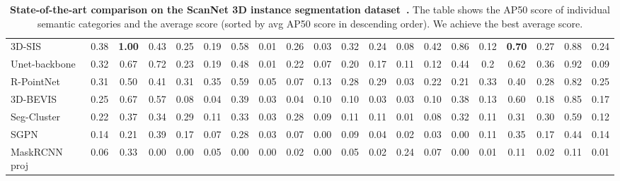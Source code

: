 \documentclass[10pt,twocolumn,letterpaper]{article}
\begin{document}
\begin{table*}[ht!]
{\begin{tabular}{l|c|cccccccccccccccccc}
3D-SIS\cite{hou20183d}         &         0.38  & \textbf{1.00} &         0.43  &         0.25  &         0.19  &         0.58  &         0.01  &         0.26  &         0.03  &         0.32  &         0.24  &         0.08  &         0.42  &         0.86  &         0.12  & \textbf{0.70} &         0.27  &         0.88  &         0.24  \\
Unet-backbone\cite{liang20193d}  &         0.32  &         0.67  &         0.72  &         0.23  &         0.19  &         0.48  &         0.01  &         0.22  &         0.07  &         0.20  &         0.17  &         0.11  &         0.12  &         0.44  &         0.2  &         0.62  &         0.36  &         0.92  &         0.09  \\
R-PointNet\cite{yi2018gspn}     &         0.31  &         0.50  &         0.41  &         0.31  &         0.35  &         0.59  &         0.05  &         0.07  &         0.13  &         0.28  &         0.29  &         0.03  &         0.22  &         0.21  &         0.33  &         0.40  &         0.28  &         0.82  &         0.25  \\
3D-BEVIS       &         0.25 &         0.67  &         0.57  &         0.08  &         0.04  &         0.39  &         0.03  &         0.04  &         0.10  &         0.10  &         0.03  &         0.03  &         0.10  &         0.38  &         0.13  &         0.60  &         0.18  &         0.85  &         0.17  \\
Seg-Cluster    &         0.22  &         0.37  &         0.34  &         0.29  &         0.11  &         0.33  &         0.03  &         0.28  &         0.09  &         0.11  &         0.11  &         0.01  &         0.08  &         0.32  &         0.11  &         0.31  &         0.30  &         0.59  &         0.12  \\
SGPN\cite{Wang-et-al-CVPR-2018}           &         0.14  &         0.21  &         0.39  &         0.17  &         0.07  &         0.28  &         0.03  &         0.07  &         0.00  &         0.09  &         0.04  &         0.02  &         0.03  &         0.00  &         0.11  &         0.35  &         0.17  &         0.44  &         0.14  \\
MaskRCNN proj  &         0.06  &         0.33  &         0.00  &         0.00  &         0.05  &         0.00  &         0.00  &         0.02  &         0.00  &         0.05  &         0.02  &         0.24  &         0.07  &         0.00  &         0.01  &         0.11  &         0.02  &         0.11   &         0.01 \\
\hline
\end{tabular}
} \vspace{0.01cm}
\caption{\textbf{State-of-the-art comparison on the ScanNet 3D instance segmentation dataset~\cite{Dai-et-al-CVPR-2017}.} The table shows the AP50 score of individual semantic categories and the average score (sorted by avg AP50 score in descending order). We achieve the best average score.} 
\label{tab:results_test}
\end{table*}
\end{document}
